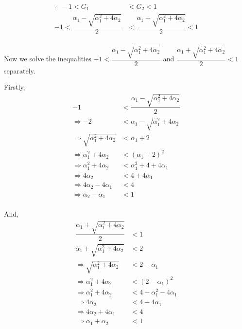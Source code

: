 \documentclass[11pt, a4paper]{article}
\numberwithin{equation}{section}
\theoremstyle{definition}
\begin{document}
\begin{align*}
\therefore \,\, -1 < G_1 &< G_2 < 1 \\[0.5em]
-1 < \dfrac{\alpha_1 - \sqrt{\alpha_1^2 + 4\alpha_2}}{2} &< \dfrac{\alpha_1 + \sqrt{\alpha_1^2 + 4\alpha_2}}{2} < 1 \\[0.5em]
\end{align*}

Now we solve the inequalities $-1 < \dfrac{\alpha_1 - \sqrt{\alpha_1^2 + 4\alpha_2}}{2}$ and $\dfrac{\alpha_1 + \sqrt{\alpha_1^2 + 4\alpha_2}}{2} < 1$ separately.


\begin{minipage}{0.45\textwidth}
Firstly,
\begin{align*}
-1 &< \dfrac{\alpha_1 - \sqrt{\alpha_1^2 + 4\alpha_2}}{2} \\[0.5em]
\Rightarrow -2 &< \alpha_1 - \sqrt{\alpha_1^2 + 4\alpha_2} \\[0.5em]
\Rightarrow \sqrt{\alpha_1^2 + 4\alpha_2} &< \alpha_1 + 2 \\[0.5em]
\Rightarrow \alpha_1^2 + 4\alpha_2 &< \left(\alpha_1 + 2\right)^2 \\[0.5em]
\Rightarrow \alpha_1^2 + 4\alpha_2 &< \alpha_1^2 + 4 + 4\alpha_1 \\[0.5em]
\Rightarrow 4\alpha_2 &< 4 + 4\alpha_1 \\[0.5em]
\Rightarrow 4\alpha_2 - 4\alpha_1 &< 4  \\[0.5em]
\Rightarrow \alpha_2 - \alpha_1 &< 1  \\[0.5em]
\end{align*}
\end{minipage}
\hfill
\begin{minipage}{0.5\textwidth}
And,
\begin{align*}
\dfrac{\alpha_1 + \sqrt{\alpha_1^2 + 4\alpha_2}}{2} &< 1 \\[0.5em]
\alpha_1 + \sqrt{\alpha_1^2 + 4\alpha_2} &< 2 \\[0.5em]
\Rightarrow \sqrt{\alpha_1^2 + 4\alpha_2} &< 2 - \alpha_1 \\[0.5em]
\Rightarrow \alpha_1^2 + 4\alpha_2 &< \left(2 - \alpha_1\right)^2 \\[0.5em]
\Rightarrow \alpha_1^2 + 4\alpha_2 &< 4 + \alpha_1^2 - 4\alpha_1 \\[0.5em]
\Rightarrow 4\alpha_2 &< 4 - 4\alpha_1 \\[0.5em]
\Rightarrow 4\alpha_2 + 4\alpha_1 &< 4 \\[0.5em]
\Rightarrow \alpha_1 + \alpha_2 &< 1 \\[0.5em]
\end{align*}
\end{minipage}
\end{document}
